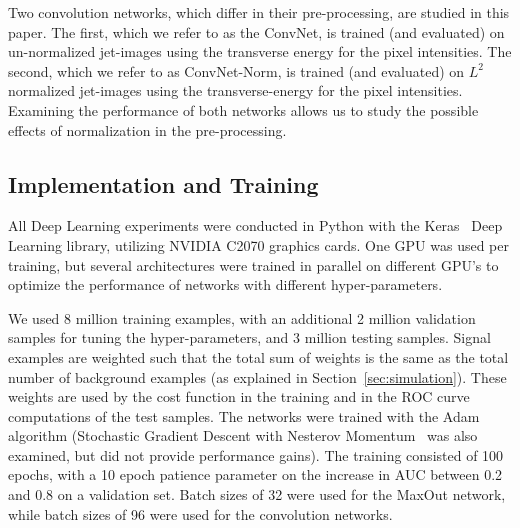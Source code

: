 Two convolution networks, which differ in their pre-processing, are studied in this paper.  The first, which we refer to as the ConvNet, is trained (and evaluated) on un-normalized jet-images using the transverse energy for the pixel intensities.  The second, which we refer to as ConvNet-Norm, is trained (and evaluated) on $L^{2}$ normalized jet-images using the transverse-energy for the pixel intensities.  Examining the performance of both networks allows us to study the possible effects of normalization in the pre-processing.




\subsection{Implementation and Training} %
\label{ssub:implementation_and_training}

All Deep Learning experiments were conducted in Python with the Keras~\cite{Keras} Deep Learning library, utilizing NVIDIA C2070 graphics cards. One GPU was used per training, but several architectures were trained in parallel on different GPU's to optimize the performance of networks with different hyper-parameters.

We used 8 million training examples, with an additional 2 million validation samples for tuning the hyper-parameters, and 3 million testing samples.  Signal examples are weighted such that the total sum of weights is the same as the total number of background examples (as explained in Section~\ref{sec:simulation}).  These weights are used by the cost function in the training and in the ROC curve computations of the test samples.  The networks were trained with the Adam~\cite{DBLP:journals/corr/KingmaB14} algorithm (Stochastic Gradient Descent with Nesterov Momentum~\cite{Nesterov:1983wy} was also examined, but did not provide performance gains).  The training consisted of 100 epochs, with a 10 epoch patience parameter on the increase in AUC between 0.2 and 0.8 on a validation set.  Batch sizes of 32 were used for the MaxOut network, while batch sizes of 96 were used for the convolution networks.


